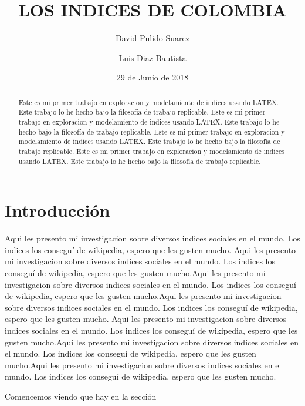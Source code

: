 \documentclass{article}
\title{LOS INDICES DE COLOMBIA}
\author[1]{\normalsize David Pulido Suarez}
\author[2]{\normalsize Luis Diaz Bautista}
\affil[1,2]{\small  Facultad de Ingeniería,Universidad de los Andes\\
\texttt{{ds.pulido10,lc.diaz12}@uniandes.edu.col}}
\date{29 de Junio de 2018}
\begin{document}


\maketitle


\begin{abstract}
Este es mi primer trabajo en exploracion y modelamiento de indices usando LATEX. Este trabajo lo he hecho bajo la filosofía de trabajo replicable. Este es mi primer trabajo en exploracion y modelamiento de indices usando LATEX. Este trabajo lo he hecho bajo la filosofía de trabajo replicable. Este es mi primer trabajo en exploracion y modelamiento de indices usando LATEX. Este trabajo lo he hecho bajo la filosofía de trabajo replicable. Este es mi primer trabajo en exploracion y modelamiento de indices usando LATEX. Este trabajo lo he hecho bajo la filosofía de trabajo replicable.
\end{abstract}

\section*{Introducción}

Aqui les presento mi investigacion sobre diversos indices sociales en el mundo. Los indices los conseguí de wikipedia, espero que les gusten mucho. Aqui les presento mi investigacion sobre diversos indices sociales en el mundo. Los indices los conseguí de wikipedia, espero que les gusten mucho.Aqui les presento mi investigacion sobre diversos indices sociales en el mundo. Los indices los conseguí de wikipedia, espero que les gusten mucho.Aqui les presento mi investigacion sobre diversos indices sociales en el mundo. Los indices los conseguí de wikipedia, espero que les gusten mucho.
Aqui les presento mi investigacion sobre diversos indices sociales en el mundo. Los indices los conseguí de wikipedia, espero que les gusten mucho.Aqui les presento mi investigacion sobre diversos indices sociales en el mundo. Los indices los conseguí de wikipedia, espero que les gusten mucho.Aqui les presento mi investigacion sobre diversos indices sociales en el mundo. Los indices los conseguí de wikipedia, espero que les gusten mucho.

Comencemos viendo que hay en la sección %

\clearpage

\clearpage

\clearpage

\clearpage

\renewcommand{\refname}{Referencias}

\end{document}
